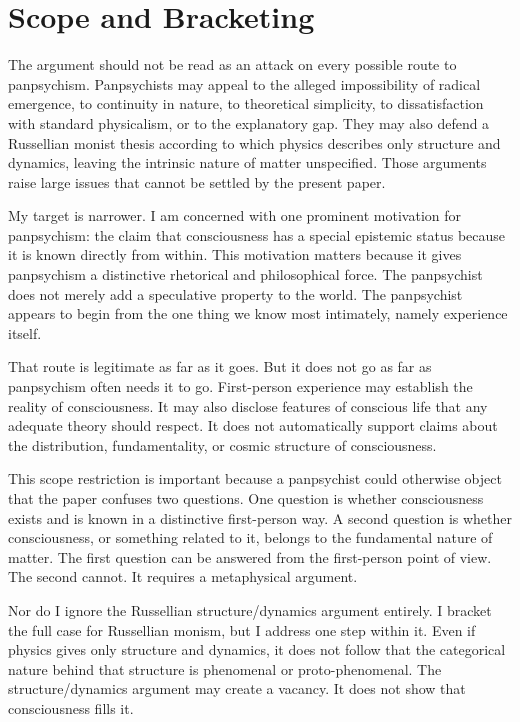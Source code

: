 \documentclass[12pt]{article}
\begin{document}
\section{Scope and Bracketing}

The argument should not be read as an attack on every possible route to panpsychism. Panpsychists may appeal to the alleged impossibility of radical emergence, to continuity in nature, to theoretical simplicity, to dissatisfaction with standard physicalism, or to the explanatory gap. They may also defend a Russellian monist thesis according to which physics describes only structure and dynamics, leaving the intrinsic nature of matter unspecified. Those arguments raise large issues that cannot be settled by the present paper.

My target is narrower. I am concerned with one prominent motivation for panpsychism: the claim that consciousness has a special epistemic status because it is known directly from within. This motivation matters because it gives panpsychism a distinctive rhetorical and philosophical force. The panpsychist does not merely add a speculative property to the world. The panpsychist appears to begin from the one thing we know most intimately, namely experience itself.

That route is legitimate as far as it goes. But it does not go as far as panpsychism often needs it to go. First-person experience may establish the reality of consciousness. It may also disclose features of conscious life that any adequate theory should respect. It does not automatically support claims about the distribution, fundamentality, or cosmic structure of consciousness.

This scope restriction is important because a panpsychist could otherwise object that the paper confuses two questions. One question is whether consciousness exists and is known in a distinctive first-person way. A second question is whether consciousness, or something related to it, belongs to the fundamental nature of matter. The first question can be answered from the first-person point of view. The second cannot. It requires a metaphysical argument.

Nor do I ignore the Russellian structure/dynamics argument entirely. I bracket the full case for Russellian monism, but I address one step within it. Even if physics gives only structure and dynamics, it does not follow that the categorical nature behind that structure is phenomenal or proto-phenomenal. The structure/dynamics argument may create a vacancy. It does not show that consciousness fills it.
\end{document}
